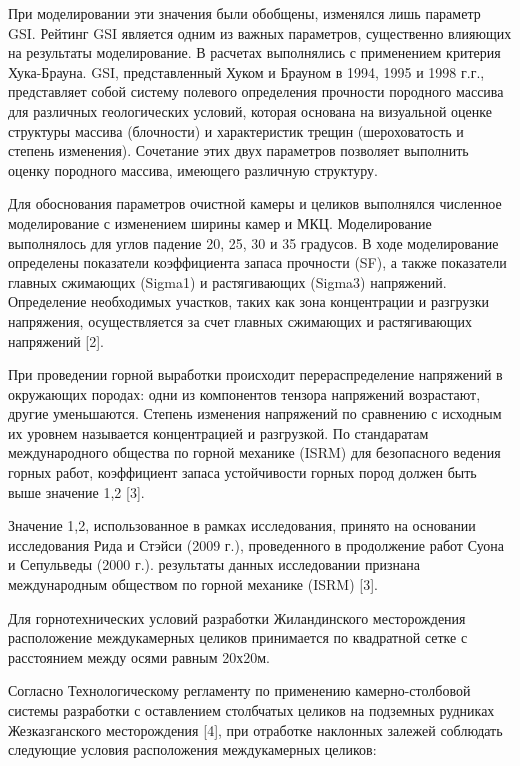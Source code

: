 \begin{multicols}{2}
При моделировании эти значения были обобщены, изменялся лишь параметр
GSI. Рейтинг GSI является одним из важных параметров, существенно
влияющих на результаты моделирование. В расчетах выполнялись с
применением критерия Хука-Брауна. GSI, представленный Хуком и Брауном в
1994, 1995 и 1998 г.г., представляет собой систему полевого определения
прочности породного массива для различных геологических условий, которая
основана на визуальной оценке структуры массива (блочности) и
характеристик трещин (шероховатость и степень изменения). Сочетание этих
двух параметров позволяет выполнить оценку породного массива, имеющего
различную структуру.

Для обоснования параметров очистной камеры и целиков выполнялся
численное моделирование с изменением ширины камер и МКЦ. Моделирование
выполнялось для углов падение 20, 25, 30 и 35 градусов. В ходе
моделирование определены показатели коэффициента запаса прочности (SF),
а также показатели главных сжимающих (Sigma1) и растягивающих (Sigma3)
напряжений. Определение необходимых участков, таких как зона
концентрации и разгрузки напряжения, осуществляется за счет главных
сжимающих и растягивающих напряжений {[}2{]}.

При проведении горной выработки происходит перераспределение напряжений
в окружающих породах: одни из компонентов тензора напряжений возрастают,
другие уменьшаются. Степень изменения напряжений по сравнению с исходным
их уровнем называется концентрацией и разгрузкой. По стандаратам
международного общества по горной механике (ISRM) для безопасного
ведения горных работ, коэффициент запаса устойчивости горных пород
должен быть выше значение 1,2 {[}3{]}.

Значение 1,2, использованное в рамках исследования, принято на основании
исследования Рида и Стэйси (2009 г.), проведенного в продолжение работ
Суона и Сепульведы (2000 г.). результаты данных исследовании признана
международным обществом по горной механике (ISRM) {[}3{]}.

Для горнотехнических условий разработки Жиландинского месторождения
расположение междукамерных целиков принимается по квадратной сетке с
расстоянием между осями равным 20х20м.

Согласно Технологическому регламенту по применению камерно-столбовой
системы разработки с оставлением столбчатых целиков на подземных
рудниках Жезказганского месторождения {[}4{]}, при отработке наклонных
залежей соблюдать следующие условия расположения междукамерных целиков:


\end{multicols}
